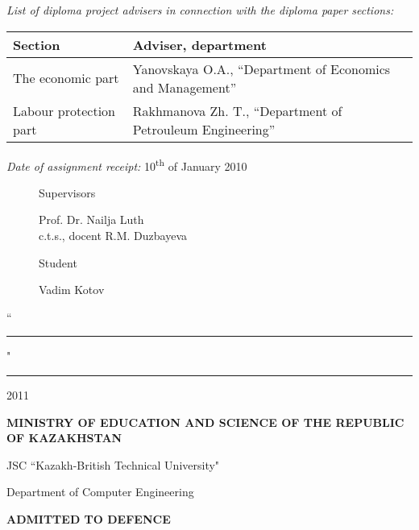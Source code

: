 \begin{titlepage}
	\emph{List of diploma project advisers in connection with the diploma paper sections:}

	\begin{centering}
		\begin{tabularx}{\textwidth}{|X|X|}
			\hline
			\textbf{Section} & \textbf{Adviser, department}\\
			\hline
			The economic part & Yanovskaya O.A., ``Department of Economics and Management'' \\
			\hline
			Labour protection part & Rakhmanova Zh. T., ``Department of Petrouleum Engineering'' \\
			\hline
		\end{tabularx}
	\end{centering}

	\emph{Date of assignment receipt:} 10\textsuperscript{th} of January 2010

	\begin{figure}[ht]
		\begin{minipage}[t]{0.5\linewidth}
			Supervisors
		\end{minipage}
		\begin{minipage}[t]{0.5\linewidth}
			Prof. Dr. Nailja Luth\\
			c.t.s., docent R.M. Duzbayeva
		\end{minipage}
	\end{figure}
	\begin{figure}[ht]
		\begin{minipage}[t]{0.5\linewidth}
			Student
		\end{minipage}
		\begin{minipage}[t]{0.5\linewidth}
			Vadim Kotov
		\end{minipage}
	\end{figure}
	``\rule{2em}{0.4pt}" \rule{8em}{0.4pt} 2011\\

	\pagebreak

	\begin{centering}
		{\bf{\MakeUppercase{Ministry of education and science of the republic of Kazakhstan}}

		\vspace{12pt}

		JSC ``Kazakh-British Technical University"

		Department of Computer Engineering}

		\begin{flushright}
			{\bf \MakeUppercase{Admitted to defence}}


\end{flushright}
\end{centering}
\end{titlepage}

